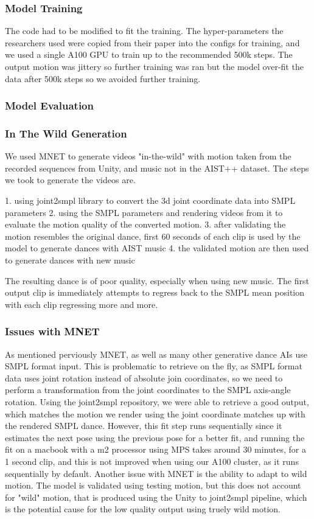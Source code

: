 \documentclass[final,5p,times,authoryear]{article}
\begin{document}
\subsubsection{Model Training}

The code had to be modified to fit the training. The hyper-parameters the
researchers used were copied from their paper into the configs for training, and
we used a single A100 GPU to train up to the recommended 500k steps. The output
motion was jittery so further training was ran but the model over-fit the data
after 500k steps so we avoided further training.


\subsubsection{Model Evaluation}

\subsubsection{In The Wild Generation}
We used MNET to generate videos "in-the-wild" with motion taken from the
recorded sequences from Unity, and music not in the AIST++ dataset. The steps we
took to generate the videos are.

1. using joint2smpl library to convert the 3d joint coordinate data into SMPL
parameters
2. using the SMPL parameters and rendering videos from it to evaluate the motion
quality of the converted motion.
3. after validating the motion resembles the original dance, first 60 seconds of
each clip is used by the model to generate dances with AIST music 
4. the validated motion are then used to generate dances with new music

The resulting dance is of poor quality, especially when using new music. The
first output clip is immediately attempts to regress back to the SMPL mean
position with each clip regressing more and more.
\subsubsection{Issues with MNET}
As mentioned perviously MNET, as well as many other generative dance AIs use
SMPL format input. This is problematic to retrieve on the fly, as SMPL format
data uses joint rotation instead of absolute join coordinates, so we need to
perform a transformation from the joint coordinates to the SMPL axis-angle
rotation. Using the joint2smpl repository, we were able to retrieve a good
output, which matches the motion we render using the joint coordinate matches up
with the rendered SMPL dance. However, this fit step runs sequentially since it
estimates the next pose using the previous pose for a better fit, and running
the fit on a macbook with a m2 processor using MPS takes around 30 minutes, for
a 1 second clip, and this is not improved when using our A100 cluster, as it
runs sequentially by default. Another issue with MNET is the ability to adapt to
wild motion. The model is validated using testing motion, but this does not
account for "wild" motion, that is produced using the Unity to joint2smpl
pipeline, which is the potential cause for the low quality output using truely
wild motion.
\end{document}
